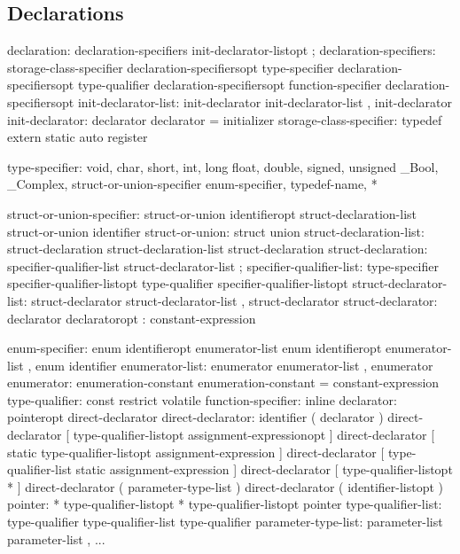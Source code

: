 \subsection{Declarations}
\begin{code_files}
declaration:
	declaration-specifiers init-declarator-listopt ;
declaration-specifiers:
	storage-class-specifier declaration-specifiersopt
	type-specifier declaration-specifiersopt
	type-qualifier declaration-specifiersopt
	function-specifier declaration-specifiersopt
init-declarator-list:
	init-declarator
	init-declarator-list , init-declarator
init-declarator:
	declarator
	declarator = initializer
storage-class-specifier:
	typedef
	extern
	static
	auto
	register

type-specifier:
	void, char, short, int, long
	float, double, signed, unsigned
	_Bool, _Complex, struct-or-union-specifier
	enum-specifier, typedef-name, *

struct-or-union-specifier:
	struct-or-union identifieropt { struct-declaration-list }
	struct-or-union identifier
struct-or-union:
	struct
	union
struct-declaration-list:
	struct-declaration
	struct-declaration-list struct-declaration
struct-declaration:
	specifier-qualifier-list struct-declarator-list ;
specifier-qualifier-list:
	type-specifier specifier-qualifier-listopt
	type-qualifier specifier-qualifier-listopt
struct-declarator-list:
	struct-declarator
	struct-declarator-list , struct-declarator
struct-declarator:
	declarator
	declaratoropt : constant-expression

enum-specifier:
	enum identifieropt { enumerator-list }
	enum identifieropt { enumerator-list , }
	enum identifier
enumerator-list:
	enumerator
	enumerator-list , enumerator
enumerator:
	enumeration-constant
	enumeration-constant = constant-expression
type-qualifier:
	const
	restrict
	volatile
function-specifier:
	inline
declarator:
	pointeropt direct-declarator
direct-declarator:
	identifier
	( declarator )
	direct-declarator [ type-qualifier-listopt assignment-expressionopt ]
	direct-declarator [ static type-qualifier-listopt assignment-expression ]
	direct-declarator [ type-qualifier-list static assignment-expression ]
	direct-declarator [ type-qualifier-listopt * ]
	direct-declarator ( parameter-type-list )
	direct-declarator ( identifier-listopt )
pointer:
	* type-qualifier-listopt
	* type-qualifier-listopt pointer
type-qualifier-list:
	type-qualifier
	type-qualifier-list type-qualifier
parameter-type-list:
	parameter-list
	parameter-list , ...


\end{code_files}
